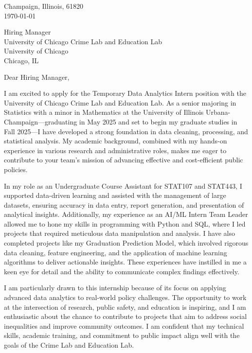 \documentclass[11pt]{article}
\begin{document}
\noindent
Champaign, Illinois, 61820 \\
\today
\vspace{2em}

\noindent
Hiring Manager\\
University of Chicago Crime Lab and Education Lab\\
University of Chicago\\
Chicago, IL

\vspace{1.5em}

Dear Hiring Manager,

I am excited to apply for the Temporary Data Analytics Intern position with the University of Chicago Crime Lab and Education Lab. As a senior majoring in Statistics with a minor in Mathematics at the University of Illinois Urbana-Champaign—graduating in May 2025 and set to begin my graduate studies in Fall 2025—I have developed a strong foundation in data cleaning, processing, and statistical analysis. My academic background, combined with my hands-on experience in various research and administrative roles, makes me eager to contribute to your team’s mission of advancing effective and cost-efficient public policies.

In my role as an Undergraduate Course Assistant for STAT107 and STAT443, I supported data-driven learning and assisted with the management of large datasets, ensuring accuracy in data entry, report generation, and presentation of analytical insights. Additionally, my experience as an AI/ML Intern Team Leader allowed me to hone my skills in programming with Python and SQL, where I led projects that required meticulous data manipulation and analysis. I have also completed projects like my Graduation Prediction Model, which involved rigorous data cleaning, feature engineering, and the application of machine learning algorithms to deliver actionable insights. These experiences have instilled in me a keen eye for detail and the ability to communicate complex findings effectively.

I am particularly drawn to this internship because of its focus on applying advanced data analytics to real-world policy challenges. The opportunity to work at the intersection of research, public safety, and education is inspiring, and I am enthusiastic about the chance to contribute to projects that aim to address social inequalities and improve community outcomes. I am confident that my technical skills, academic training, and commitment to public impact align well with the goals of the Crime Lab and Education Lab.
\end{document}
